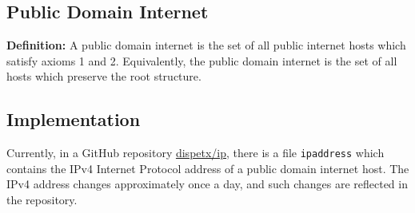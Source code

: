 \documentclass{article}
\begin{document}
\subsection*{Public Domain Internet}
\textbf{Definition:} A public domain internet is the set of all public internet
hosts which satisfy axioms 1 and 2. Equivalently, the public domain internet is
the set of all hosts which preserve the root structure.

\subsection*{Implementation}
Currently, in a GitHub repository
\href{https://github.com/dispetx/ip}{dispetx/ip}, there is a file
\texttt{ipaddress} which contains the IPv4 Internet Protocol address of a
public domain internet host. The IPv4 address changes approximately once a day,
and such changes are reflected in the repository.
\end{document}
